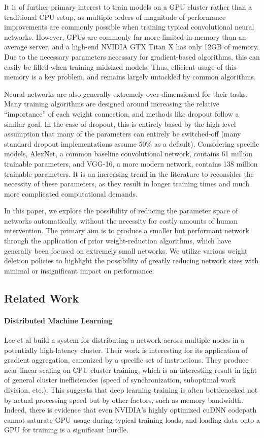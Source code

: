 \documentclass[10pt,twocolumn,letterpaper]{article}
\begin{document}
It is of further primary interest to train models on a GPU cluster rather than a traditional CPU setup, as multiple orders of magnitude of performance improvements  are commonly possible when training typical convolutional neural networks.
However, GPUs are commonly far more limited in memory than an average server, and a high-end NVIDIA GTX Titan X has only 12GB of memory.
Due to the necessary parameters necessary for gradient-based algorithms, this can easily be filled when training midsized models.
Thus, efficient usage of this memory is a key problem, and remains largely untackled by common algorithms.

Neural networks are also generally extremely over-dimensioned for their tasks.
Many training algorithms are designed around increasing the relative ``importance'' of each weight connection, and methods like dropout follow a similar goal.
In the case of dropout, this is entirely based by the high-level assumption that many of the parameters can entirely be switched-off (many standard dropout implementations assume 50\% as a default).
Considering specific models, AlexNet, a common baseline convolutional network, contains 61 million trainable parameters, and VGG-16, a more modern network, contains 138 million trainable parameters.
It is an increasing trend in the literature to reconsider the necessity of these parameters, as they result in longer training times and much more complicated computational demands.

In this paper, we explore the possibility of reducing the parameter space of networks automatically, without the necessity for costly amounts of human intervention.
The primary aim is to produce a smaller but performant network through the application of prior weight-reduction algorithms, which have generally been focused on extremely small networks.
We utilize various weight deletion policies to highlight the possibility of greatly reducing network sizes with minimal or insignificant impact on performance.

\subsection{Related Work}
\paragraph{Distributed Machine Learning}
Lee et al \cite{lee2014model} build a system for distributing a network across multiple nodes in a potentially high-latency cluster.
Their work is interesting for its application of gradient aggregation, canonized by a specific set of instructions.
They produce near-linear scaling on CPU cluster training, which is an interesting result in light of general cluster inefficiencies (speed of synchronization, suboptimal work division, etc.).
This suggests that deep learning training is often bottlenecked not by actual processing speed but by other factors, such as memory bandwidth.
Indeed, there is evidence that even NVIDIA's highly optimized cuDNN codepath cannot saturate GPU usage during typical training loads, and loading data onto a GPU for training is a significant hurdle.
\end{document}
